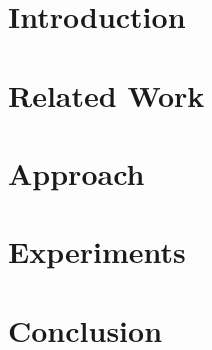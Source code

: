 \section{Introduction}


% 

\section{Related Work}


\section{Approach}


\section{Experiments}


\section{Conclusion}


\clearpage




\clearpage

